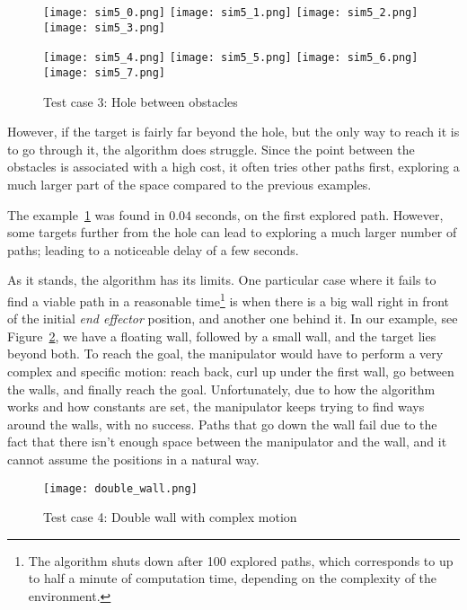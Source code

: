 \begin{figure}[h]
  \centering
  \begin{minipage}{\textwidth}
    \texttt{[image: sim5\_0.png]}
    \texttt{[image: sim5\_1.png]}
    \texttt{[image: sim5\_2.png]}
    \texttt{[image: sim5\_3.png]}

    \texttt{[image: sim5\_4.png]}
    \texttt{[image: sim5\_5.png]}
    \texttt{[image: sim5\_6.png]}
    \texttt{[image: sim5\_7.png]}
  \end{minipage}
  \caption{Test case 3: Hole between obstacles}\label{fig:sim5}
\end{figure}

However, if the target is fairly far beyond the hole, but the only way to reach it is to go through it, the algorithm does struggle. Since the point between the obstacles is associated with a high cost, it often tries other paths first, exploring a much larger part of the space compared to the previous examples.

The example~\ref{fig:sim5} was found in $0.04$ seconds, on the first explored path. However, some targets further from the hole can lead to exploring a much larger number of paths; leading to a noticeable delay of a few seconds.

As it stands, the algorithm has its limits. One particular case where it fails to find a viable path in a reasonable time\footnote{The algorithm shuts down after 100 explored paths, which corresponds to up to half a minute of computation time, depending on the complexity of the environment.} is when there is a big wall right in front of the initial \textit{end effector} position, and another one behind it. In our example, see Figure~\ref{fig:d_wall}, we have a floating wall, followed by a small wall, and the target lies beyond both. To reach the goal, the manipulator would have to perform a very complex and specific motion: reach back, curl up under the first wall, go between the walls, and finally reach the goal. Unfortunately, due to how the algorithm works and how constants are set, the manipulator keeps trying to find ways around the walls, with no success. Paths that go down the wall fail due to the fact that there isn't enough space between the manipulator and the wall, and it cannot assume the positions in a natural way.

\begin{figure}
  \centering
  \texttt{[image: double\_wall.png]}
  \caption{Test case 4: Double wall with complex motion}\label{fig:d_wall}
\end{figure}


